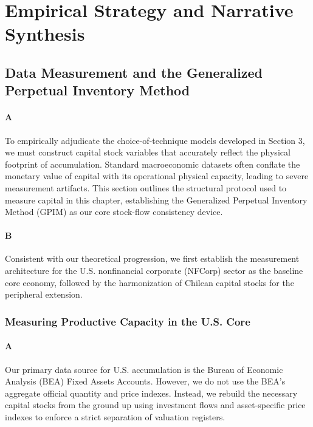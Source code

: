 \section{Empirical Strategy and Narrative Synthesis}

\subsection{Data Measurement and the Generalized Perpetual Inventory Method}

\paragraph{A}
To empirically adjudicate the choice-of-technique models developed in Section 3, we must construct capital stock variables that accurately reflect the physical footprint of accumulation. Standard macroeconomic datasets often conflate the monetary value of capital with its operational physical capacity, leading to severe measurement artifacts. This section outlines the structural protocol used to measure capital in this chapter, establishing the Generalized Perpetual Inventory Method (GPIM) as our core stock-flow consistency device.

\paragraph{B}
Consistent with our theoretical progression, we first establish the measurement architecture for the U.S. nonfinancial corporate (NFCorp) sector as the baseline core economy, followed by the harmonization of Chilean capital stocks for the peripheral extension.

\subsubsection{Measuring Productive Capacity in the U.S. Core}

\paragraph{A}
Our primary data source for U.S. accumulation is the Bureau of Economic Analysis (BEA) Fixed Assets Accounts. However, we do not use the BEA's aggregate official quantity and price indexes. Instead, we rebuild the necessary capital stocks from the ground up using investment flows and asset-specific price indexes to enforce a strict separation of valuation registers.

